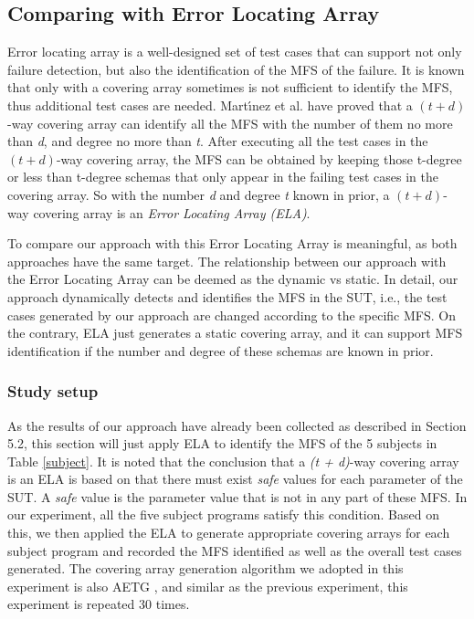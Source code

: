 \documentclass{sig-alternate}
\begin{document}
\subsection{Comparing with Error Locating Array}
Error locating array\cite{colbourn2008locating,martinez2009locating} is a well-designed set of test cases that can support not only failure detection, but also the identification of the MFS of the failure. It is known that only with a covering array sometimes is not sufficient to identify the MFS, thus additional test cases are needed. Mart{\'\i}nez et al.\cite{martinez2008algorithms} have proved that a $(t + d)$-way covering array can identify all the MFS with the number of them no more than \emph{d}, and degree no more than \emph{t}.
After executing all the test cases in the $(t + d)$-way covering array, the MFS can be obtained by keeping those t-degree or less than t-degree schemas that only appear in the failing test cases in the covering array.  So with the number \emph{d} and degree \emph{t} known in prior, a $(t + d)$-way covering array is an \emph{Error Locating Array (ELA)}.


To compare our approach with this Error Locating Array is meaningful, as both approaches have the same target. The relationship between our approach with the Error Locating Array can be deemed as the dynamic vs static. In detail, our approach dynamically detects and identifies the MFS in the SUT, i.e., the test cases generated by our approach are changed according to the specific MFS. On the contrary, ELA just generates a static covering array, and it can support MFS identification if the number and degree of these schemas are known in prior.



\subsubsection{Study setup}
As the results of our approach have already been collected as described in Section 5.2, this section will just apply ELA to identify the MFS of the 5 subjects in Table \ref{subject}. It is noted that the conclusion that a \emph{(t + d)}-way covering array is an ELA
 is based on that there must exist \emph{safe} values for each parameter of the SUT. A \emph{safe} value is the parameter value that is not in any part of these MFS. In our experiment, all the five subject programs satisfy this condition. Based on this, we then applied the ELA to generate appropriate covering arrays for each subject program and recorded the MFS identified as well as the overall test cases generated. The covering array generation algorithm we adopted in this experiment is also AETG \cite{cohen1997aetg}, and similar as the previous experiment, this experiment is repeated 30 times.
\end{document}
